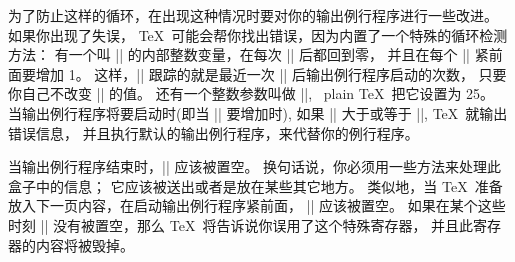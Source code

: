\ddanger \1为了防止这样的循环，在出现这种情况时要对你的输出例行程序进行一些改进。%
如果你出现了失误， \TeX\ 可能会帮你找出错误，因为内置了一个特殊的循环检测方法：
有一个叫 |\deadcycles| 的内部整数变量，在每次 |\shipout| 后都回到零，
并且在每个 |\output| 紧前面要增加 1。%
这样，|\deadcycles| 跟踪的就是最近一次 |\shipout| 后输出例行程序启动的次数，
只要你自己不改变 |\deadcycles| 的值。%
还有一个整数参数叫做 |\maxdeadcycles|, ~plain \TeX\ 把它设置为 25。%
当输出例行程序将要启动时(即当 |\deadcycles| 要增加时),
如果 |\deadcycles| 大于或等于 |\maxdeadcycles|,  \TeX\ 就输出错误信息，
并且执行默认的输出例行程序，来代替你的例行程序。

\ddanger 当输出例行程序结束时，|| 应该被置空。%
换句话说，你必须用一些方法来处理此盒子中的信息；
它应该被送出或者是放在某些其它地方。%
类似地，当 \TeX\ 准备放入下一页内容，在启动输出例行程序紧前面，
|| 应该被置空。%
如果在某个这些时刻 || 没有被置空，那么 \TeX\ 将告诉说你误用了这个特殊寄存器，
并且此寄存器的内容将被毁掉。

